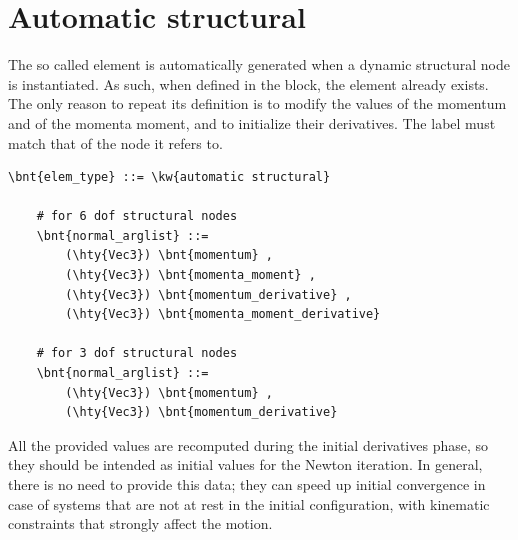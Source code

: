 \section{Automatic structural}
The so called  element is automatically generated
when a dynamic structural node is instantiated.
As such, when defined in the  block,
the element already exists.
The only reason to repeat its definition is to modify the values
of the momentum and of the momenta moment, and to initialize
their derivatives.
The label must match that of the node it refers to.
\begin{Verbatim}[commandchars=\\\{\}]
    \bnt{elem_type} ::= \kw{automatic structural}

    # for 6 dof structural nodes
    \bnt{normal_arglist} ::=
        (\hty{Vec3}) \bnt{momentum} ,
        (\hty{Vec3}) \bnt{momenta_moment} ,
        (\hty{Vec3}) \bnt{momentum_derivative} ,
        (\hty{Vec3}) \bnt{momenta_moment_derivative}

    # for 3 dof structural nodes
    \bnt{normal_arglist} ::=
        (\hty{Vec3}) \bnt{momentum} ,
        (\hty{Vec3}) \bnt{momentum_derivative}
\end{Verbatim}
All the provided values are recomputed during the initial derivatives phase,
so they should be intended as initial values for the Newton iteration.
In general, there is no need to provide this data; they can speed up
initial convergence in case of systems that are not at rest in the initial
configuration, with kinematic constraints that strongly affect
the motion.

